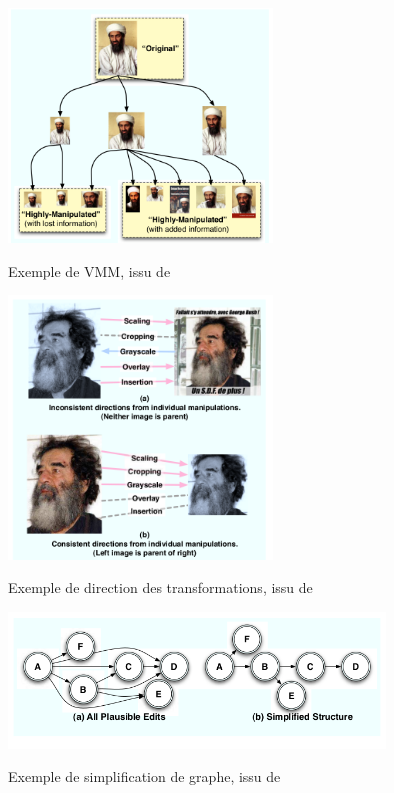 \documentclass[utf8]{stageM2R} %
\begin{document}
\begin{figure}
  \begin{center}
    \includegraphics[width=70mm]{images/vmm.png}
    \label{vmm}
    \caption{Exemple de VMM, issu de \cite{kennedy2008internet}}
  \end{center}
\end{figure}

\begin{figure}
  \begin{center}
    \includegraphics[width=70mm]{images/vmm_directionnel.png}
    \label{vmm_directionnel}
    \caption{Exemple de direction des transformations, issu de \cite{kennedy2008internet}}
  \end{center}
\end{figure}

\begin{figure}
  \begin{center}
    \includegraphics[width=100mm]{images/vmm_tree.png}
    \label{vmm_tree}
    \caption{Exemple de simplification de graphe, issu de \cite{kennedy2008internet}}
  \end{center}
\end{figure}
\end{document}
